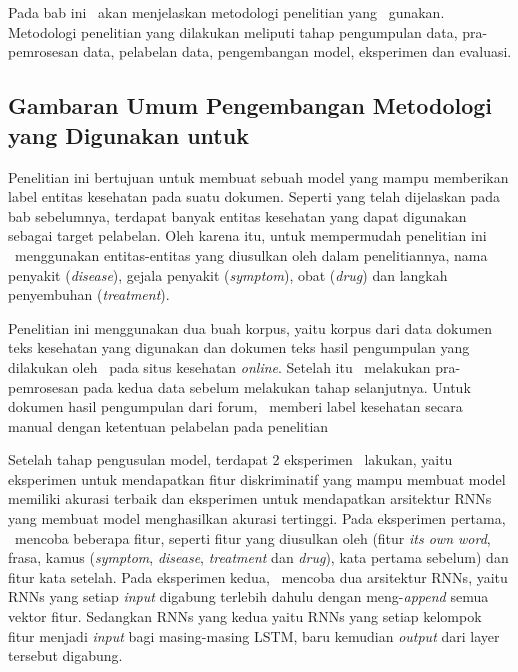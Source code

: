 \chapter{\babTiga}\label{bab:tiga}
Pada bab ini \saya~akan menjelaskan metodologi penelitian yang \saya~gunakan. Metodologi penelitian yang dilakukan meliputi tahap pengumpulan data, pra-pemrosesan data, pelabelan data, pengembangan model, eksperimen dan evaluasi.

\section{Gambaran Umum Pengembangan Metodologi yang Digunakan untuk }
Penelitian ini bertujuan untuk membuat sebuah model yang mampu memberikan label entitas kesehatan pada suatu dokumen. Seperti yang telah dijelaskan pada bab sebelumnya, terdapat banyak entitas kesehatan yang dapat digunakan sebagai target pelabelan. Oleh karena itu, untuk mempermudah penelitian ini \saya~menggunakan entitas-entitas yang diusulkan oleh \cite{skripsiKakRadit} dalam penelitiannya,  nama penyakit (\textit{disease}), gejala penyakit (\textit{symptom}), obat (\textit{drug}) dan langkah penyembuhan (\textit{treatment}).

Penelitian ini menggunakan dua buah korpus, yaitu korpus dari data dokumen teks kesehatan yang digunakan \cite{skripsiKakRadit} dan dokumen teks hasil pengumpulan yang dilakukan oleh \saya~pada situs kesehatan \textit{online}. Setelah itu \saya~melakukan pra-pemrosesan pada kedua data sebelum melakukan tahap selanjutnya. Untuk dokumen hasil pengumpulan dari forum, \saya~memberi label kesehatan secara manual dengan ketentuan pelabelan pada penelitian \cite{skripsiKakRadit}

Setelah tahap pengusulan model, terdapat 2 eksperimen \saya~lakukan, yaitu eksperimen untuk mendapatkan fitur diskriminatif yang mampu membuat model memiliki akurasi terbaik dan eksperimen untuk mendapatkan arsitektur RNNs yang membuat model menghasilkan akurasi tertinggi. Pada eksperimen pertama, \saya~mencoba beberapa fitur, seperti fitur yang diusulkan oleh \cite{skripsiKakRadit} (fitur \textit{its own word}, frasa, kamus (\textit{symptom}, \textit{disease}, \textit{treatment} dan \textit{drug}), kata pertama sebelum) dan fitur kata setelah. Pada eksperimen kedua, \saya~mencoba dua arsitektur RNNs, yaitu RNNs yang setiap \textit{input} digabung terlebih dahulu dengan meng-\textit{append} semua vektor fitur. Sedangkan RNNs yang kedua yaitu RNNs yang setiap kelompok fitur menjadi \textit{input} bagi masing-masing LSTM, baru kemudian \textit{output} dari layer tersebut digabung.

